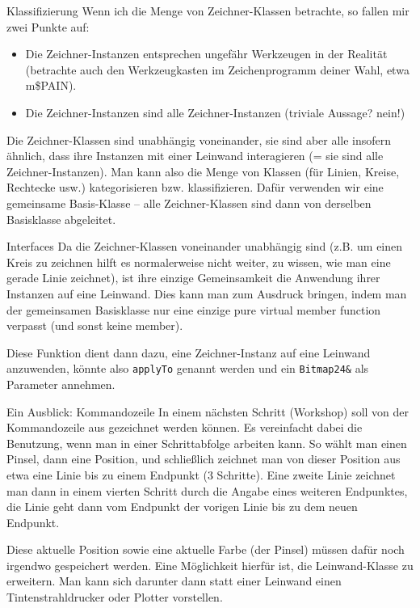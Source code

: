 \begin{frame}{Klassifizierung}
	Wenn ich die Menge von Zeichner-Klassen betrachte, so fallen mir zwei Punkte auf:
	\begin{itemize}
		\item Die Zeichner-Instanzen entsprechen ungefähr Werkzeugen in der Realität (betrachte auch den Werkzeugkasten im Zeichenprogramm deiner Wahl, etwa m\$PAIN).
		\item Die Zeichner-Instanzen sind alle Zeichner-Instanzen (triviale Aussage? nein!)
	\end{itemize}
	
	\pause
	\vspace{1em}
	
	Die Zeichner-Klassen sind unabhängig voneinander, sie sind aber alle insofern ähnlich, dass ihre Instanzen mit einer Leinwand interagieren (= sie sind alle Zeichner-Instanzen). Man kann also die Menge von Klassen (für Linien, Kreise, Rechtecke usw.) kategorisieren bzw. klassifizieren. Dafür verwenden wir eine gemeinsame Basis-Klasse -- alle Zeichner-Klassen sind dann von derselben Basisklasse abgeleitet.
\end{frame}

\begin{frame}[fragile]{Interfaces}
	Da die Zeichner-Klassen voneinander unabhängig sind (z.B. um einen Kreis zu zeichnen hilft es normalerweise nicht weiter, zu wissen, wie man eine gerade Linie zeichnet), ist ihre einzige Gemeinsamkeit die Anwendung ihrer Instanzen auf eine Leinwand. Dies kann man zum Ausdruck bringen, indem man der gemeinsamen Basisklasse nur eine einzige pure virtual member function verpasst (und sonst keine member).
	
	\pause
	\vspace{1em}
	
	Diese Funktion dient dann dazu, eine Zeichner-Instanz auf eine Leinwand anzuwenden, könnte also \verb|applyTo| genannt werden und ein \verb|Bitmap24&| als Parameter annehmen.
\end{frame}

\begin{frame}[fragile]{Ein Ausblick: Kommandozeile}
	In einem nächsten Schritt (Workshop) soll von der Kommandozeile aus gezeichnet werden können. Es vereinfacht dabei die Benutzung, wenn man in einer Schrittabfolge arbeiten kann. So wählt man einen Pinsel, dann eine Position, und schließlich zeichnet man von dieser Position aus etwa eine Linie bis zu einem Endpunkt (3 Schritte). Eine zweite Linie zeichnet man dann in einem vierten Schritt durch die Angabe eines weiteren Endpunktes, die Linie geht dann vom Endpunkt der vorigen Linie bis zu dem neuen Endpunkt.
	
	\pause
	\vspace{1em}
	
	Diese aktuelle Position sowie eine aktuelle Farbe (der Pinsel) müssen dafür noch irgendwo gespeichert werden. Eine Möglichkeit hierfür ist, die Leinwand-Klasse zu erweitern. Man kann sich darunter dann statt einer Leinwand einen Tintenstrahldrucker oder Plotter vorstellen.
\end{frame}

